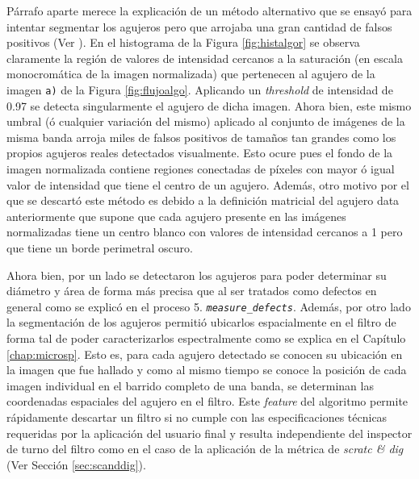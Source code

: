 \begin{enumerate}
\hspace{0.5cm}Párrafo aparte merece la explicación de un método alternativo que se ensayó para intentar segmentar los agujeros pero que arrojaba una gran cantidad de falsos positivos (Ver \href{https://github.com/jrr1984/defects_analysis/blob/master/MAIN/find_contours_holes_trial.py}{\faGithub}). En el histograma de la Figura \ref{fig:histalgor} se observa claramente la región de valores de intensidad cercanos a la saturación (en escala monocromática de la imagen normalizada) que pertenecen al agujero de la imagen \texttt{a)} de la Figura \ref{fig:flujoalgo}. Aplicando un \textit{threshold} de intensidad de 0.97 se detecta singularmente el agujero de dicha imagen. Ahora bien, este mismo umbral (ó cualquier variación del mismo) aplicado al conjunto de imágenes de la misma banda arroja miles de falsos positivos de tamaños tan grandes como los propios agujeros reales detectados visualmente. Esto ocure pues el fondo de la imagen normalizada contiene regiones conectadas de píxeles con mayor ó igual valor de intensidad que tiene el centro de un agujero. Además, otro motivo por el que se descartó este método es debido a la definición matricial del agujero data anteriormente que supone que cada agujero presente en las imágenes normalizadas tiene un centro blanco con valores de intensidad cercanos a 1 pero que tiene un borde perimetral oscuro.

\hspace{0.5cm}Ahora bien, por un lado se detectaron los agujeros para poder determinar su diámetro y área de forma más precisa que al ser tratados como defectos en general como se explicó en el proceso 5. \texttt{\textit{measure\_defects}}. Además, por otro lado la segmentación de los agujeros permitió ubicarlos espacialmente en el filtro de forma tal de poder caracterizarlos espectralmente como se explica en el Capítulo \ref{chap:microsp}. Esto es, para cada agujero detectado se conocen su ubicación en la imagen que fue hallado y como al mismo tiempo se conoce la posición de cada imagen individual en el barrido completo de una banda, se determinan las coordenadas espaciales del agujero en el filtro. Este \textit{feature} del algoritmo permite rápidamente descartar un filtro si no cumple con las especificaciones técnicas requeridas por la aplicación del usuario final y resulta independiente del inspector de turno del filtro como en el caso de la aplicación de la métrica de \textit{scratc \& dig} (Ver Sección \ref{sec:scanddig}).


\end{enumerate}
